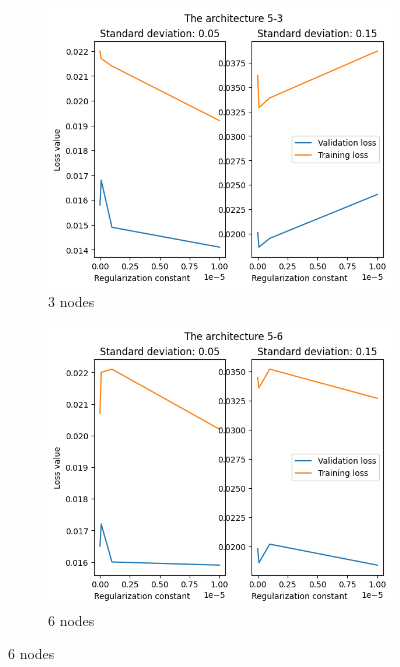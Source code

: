 \documentclass[a4paper]{article}
\begin{document}
\begin{figure}[ht]
    \centering
    \begin{subfigure}{0.4\textwidth}
        \centering
        \includegraphics[width=\textwidth]{Labs/Lab 1/Lab 1b/Part2/figure/5-3.png}
        \caption{3 nodes}
    \end{subfigure}
    \hfill
    \begin{subfigure}{0.4\textwidth}
        \centering
        \includegraphics[width=\textwidth]{Labs/Lab 1/Lab 1b/Part2/figure/5-6.png}
        \caption{6 nodes}
    \end{subfigure}

\end{figure}
\end{document}
